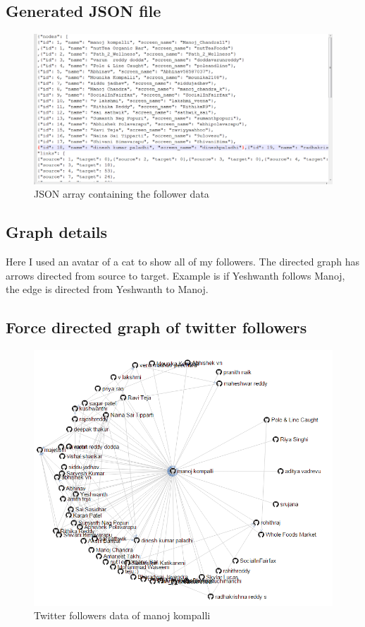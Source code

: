 \documentclass[12pt]{article}
\begin{document}
\subsection{Generated JSON file}
\begin{figure}[ht]
\includegraphics[scale=0.7]{../q1/screenjson.png}
\centering
\caption{JSON array containing the follower data}
\label{fig:JSON array containing the follower data}
\end{figure}

\newpage
\subsection{Graph details}
Here I used an avatar of a cat to show all of my followers. The directed graph has arrows directed from source to target. Example is if  Yeshwanth follows Manoj, the edge is directed from Yeshwanth to Manoj.


\subsection{Force directed graph of twitter followers }
\begin{figure}[ht]
\includegraphics[scale=0.7]{../q1/gr1.png}
\centering
\caption{Twitter followers data of manoj kompalli}
\label{Removed edges}
\end{figure}
\end{document}
